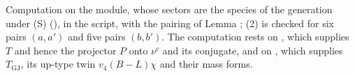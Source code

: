 Computation on the module, whose sectors are the species of the generation under (S) (), in the script, with the pairing of Lemma ; (2) is checked for six pairs $(a, a')$ and five pairs $(b, b')$. The computation rests on , which supplies $T$ and hence the projector $P$ onto $\nu^{c}$ and its conjugate, and on , which supplies $T_{\mathrm{GJ}}$, its up-type twin $v_{4}(B - L)\chi$ and their mass forms.

